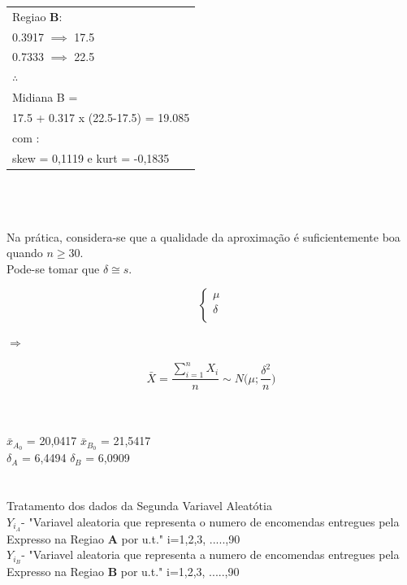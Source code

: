\begin{minipage}[l]{0pt}
\begin{tabular}{l}
Regiao \textbf{B}: \\
0.3917 $\implies$ 17.5 \\
0.7333 $\implies$ 22.5 \\
$\therefore$\\
Midiana B = \\
17.5 + 0.317 x (22.5-17.5) = 19.085 \\
com : \\
skew = 0,1119 e kurt = -0,1835 \\
\end{tabular}
\end{minipage}\\
\\
\\
\noindent
Na prática, considera-se que a qualidade da aproximação é suficientemente boa quando $n \geqslant 30$.  \\
Pode-se tomar que $\delta \cong s$. \\
\begin{minipage}[l]{0pt}
$$\left\lbrace\begin{array}{c}
\mu \\
\delta \\
\end{array}\right.$$
\end{minipage}
\hspace{3cm} $\Longrightarrow$ \hspace{3cm}
\begin{minipage}[l]{0pt}
\[\bar{X}=\frac{\sum_{i=1}^nX_i}{n}\sim N \big(\mu;\frac{\delta^2}{n}\big)\]
\end{minipage}\\
\\
$\bar{x}_{A_0}$ = 20,0417 \qquad $\bar{x}_{B_0}$ = 21,5417 \\
$\delta_A$ = 6,4494 \qquad $\delta_B$ = 6,0909\\
\\
\\
\noindent
Tratamento dos dados da Segunda Variavel Aleatótia \\
$Y_{i_A}$- "Variavel aleatoria que representa o numero de encomendas entregues pela Expresso na Regiao \textbf{A} por u.t." \quad i=1,2,3, .....,90 \\
$Y_{i_B}$- "Variavel aleatoria que representa a numero de encomendas entregues pela Expresso na Regiao \textbf{B} por u.t." \quad i=1,2,3, .....,90 \\
